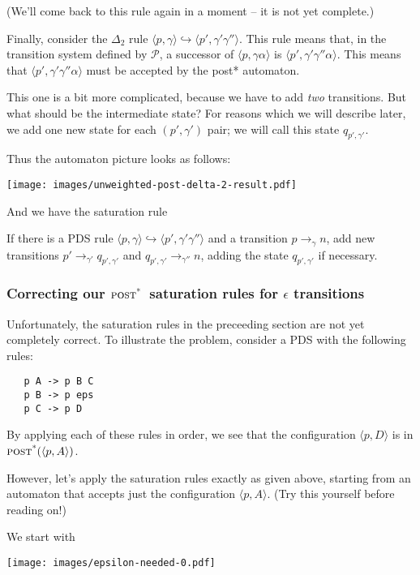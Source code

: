 \documentclass{article}
\newcommand{\Config}[2]{\ensuremath{\langle #1, #2 \rangle}}
\newcommand{\Rule}[2]{\ensuremath{#1 \hookrightarrow #2}}
\newcommand{\Trans}[3]{\ensuremath{#1 \rightarrow_{#2} #3}}
\newcommand{\poststar}{\ensuremath{\textsc{post}^\textsc{*}}}
\begin{document}
(We'll come back to this rule again in a moment -- it is not yet
complete.)

Finally, consider the $\Delta_2$ rule
\Rule{\Config{p}{\gamma}}{\Config{p'}{\gamma'\gamma''}}. This rule
means that, in the transition system defined by $\mathcal{P}$, a
successor of \Config{p}{\gamma\alpha} is
\Config{p'}{\gamma'\gamma''\alpha}. This means that
\Config{p'}{\gamma'\gamma''\alpha} must be accepted by the post*
automaton.

This one is a bit more complicated, because we have to add \emph{two}
transitions. But what should be the intermediate state? For reasons
which we will describe later, we add one new state for each
$(p',\gamma')$ pair; we will call this state $q_{p',\gamma'}$.

Thus the automaton picture looks as follows:
\begin{center}
  \texttt{[image: images/unweighted-post-delta-2-result.pdf]}
\end{center}

And we have the saturation rule

   If there is a PDS rule
   \Rule{\Config{p}{\gamma}}{\Config{p'}{\gamma'\gamma''}} and a
   transition \Trans{p}{\gamma}{n}, add new transitions
   \Trans{p'}{\gamma'}{q_{p',\gamma'}} and
   \Trans{q_{p',\gamma'}}{\gamma''}{n}, adding the state $q_{p',\gamma'}$
   if necessary.


\subsubsection{Correcting our \poststar\ saturation rules for $\epsilon$
  transitions}

Unfortunately, the saturation rules in the preceeding section are not
yet completely correct. To illustrate the problem, consider a PDS with
the following rules:

\begin{verbatim}
   p A -> p B C
   p B -> p eps
   p C -> p D
\end{verbatim}

By applying each of these rules in order, we see that the
configuration \Config{p}{D} is in $\poststar(\Config{p}{A})$.

However, let's apply the saturation rules exactly as given above,
starting from an automaton that accepts just the configuration
\Config{p}{A}. (Try this yourself before reading on!)

We start with
\begin{center}
  \texttt{[image: images/epsilon-needed-0.pdf]}
\end{center}
\end{document}

